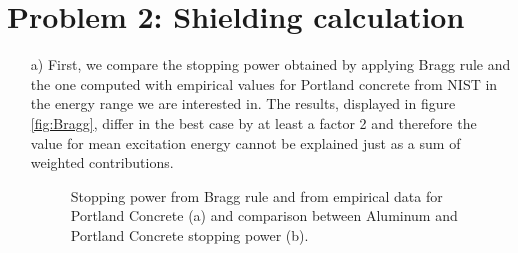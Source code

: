 \documentclass[10pt,a4paper]{article}
\begin{document}
\section*{Problem 2: Shielding calculation}
\begin{enumerate}

\item[a)] First, we compare the stopping power obtained by applying Bragg rule and the one computed with empirical values for Portland concrete from NIST in the energy range we are interested in. The results, displayed in figure \ref{fig:Bragg}, differ in the best case by at least a factor 2 and therefore the value for mean excitation energy cannot be explained just as a sum of weighted contributions. 

\begin{figure}
\centering
{}
\caption{Stopping power from Bragg rule and from empirical data for Portland Concrete (a) and comparison between Aluminum and Portland Concrete stopping power (b).}
\end{figure}


\end{enumerate}
\end{document}
